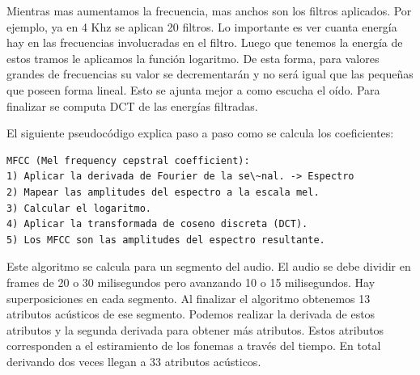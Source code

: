 \documentclass[11pt,a4paper,twoside]{tesis}
\begin{document}

Mientras mas aumentamos la frecuencia, mas anchos son los filtros aplicados. Por ejemplo, ya en 4 Khz se aplican 20 filtros. Lo importante es ver cuanta energía hay en las frecuencias involucradas en el filtro. Luego que tenemos la energía de estos tramos le aplicamos la función logaritmo. De esta forma, para valores grandes de frecuencias su valor se decrementarán y no será igual que las pequeñas que poseen forma lineal. Esto se ajunta mejor a como escucha el oído. Para finalizar se computa DCT de las energías filtradas. 

El siguiente pseudocódigo explica paso a paso como se calcula los coeficientes:
\begin{lstlisting}
MFCC (Mel frequency cepstral coefficient):
1) Aplicar la derivada de Fourier de la se\~nal. -> Espectro
2) Mapear las amplitudes del espectro a la escala mel.
3) Calcular el logaritmo.
4) Aplicar la transformada de coseno discreta (DCT).
5) Los MFCC son las amplitudes del espectro resultante.
\end{lstlisting}

Este algoritmo se calcula para un segmento del audio. El audio se debe dividir en frames de 20 o 30 milisegundos pero avanzando 10 o 15 milisegundos. Hay superposiciones en cada segmento. Al finalizar el algoritmo obtenemos 13 atributos acústicos de ese segmento. Podemos realizar la derivada de estos atributos y la segunda derivada para obtener más atributos. Estos atributos corresponden a el estiramiento de los fonemas a través del tiempo. En total derivando dos veces llegan a 33 atributos acústicos.
\end{document}
